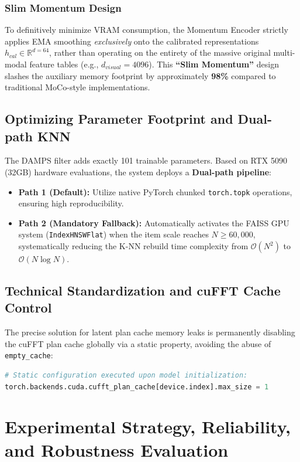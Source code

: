 \documentclass[12pt, a4paper]{article}
\begin{document}
\subsubsection{Slim Momentum Design}
To definitively minimize VRAM consumption, the Momentum Encoder strictly applies EMA smoothing \textit{exclusively} onto the calibrated representations $h_{cal} \in \mathbb{R}^{d=64}$, rather than operating on the entirety of the massive original multi-modal feature tables (e.g., $d_{visual}=4096$). This \textbf{``Slim Momentum''} design slashes the auxiliary memory footprint by approximately \textbf{98\%} compared to traditional MoCo-style implementations.

\subsection{Optimizing Parameter Footprint and Dual-path KNN}
The DAMPS filter adds exactly 101 trainable parameters. Based on RTX 5090 (32GB) hardware evaluations, the system deploys a \textbf{Dual-path pipeline}:
\begin{itemize}
    \item \textbf{Path 1 (Default):} Utilize native PyTorch chunked \texttt{torch.topk} operations, ensuring high reproducibility.
    \item \textbf{Path 2 (Mandatory Fallback):} Automatically activates the FAISS GPU system (\texttt{IndexHNSWFlat}) when the item scale reaches $N \ge 60,000$, systematically reducing the K-NN rebuild time complexity from $\mathcal{O}(N^2)$ to $\mathcal{O}(N \log N)$.
\end{itemize}

\subsection{Technical Standardization and cuFFT Cache Control}
The precise solution for latent plan cache memory leaks is permanently disabling the cuFFT plan cache globally via a static property, avoiding the abuse of \texttt{empty\_cache}:
\begin{lstlisting}[language=Python]
# Static configuration executed upon model initialization:
torch.backends.cuda.cufft_plan_cache[device.index].max_size = 1
\end{lstlisting}

\section{Experimental Strategy, Reliability, and Robustness Evaluation}
\end{document}
